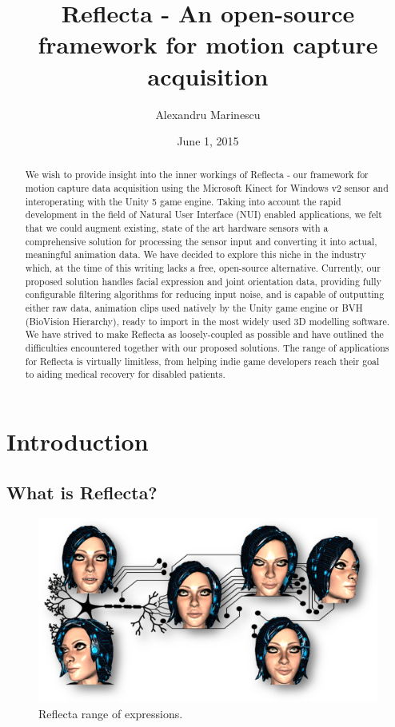 \documentclass[a4paper, 12pt]{amsart}
\title[Reflecta]{Reflecta - An open-source framework for motion capture acquisition} %
\author{Alexandru Marinescu}
\date{June 1, 2015} %
\begin{document}
\begin{abstract}
We wish to provide insight into the inner workings of Reflecta - our framework for motion capture data acquisition using the Microsoft Kinect for Windows v2 sensor and interoperating with the Unity 5 game engine. Taking into account the rapid development in the field of Natural User Interface (NUI) enabled applications, we felt that we could augment existing, state of the art hardware sensors with a comprehensive solution for processing the sensor input and converting it into actual, meaningful animation data. We have decided to explore this niche in the industry which, at the time of this writing lacks a free, open-source alternative. Currently, our proposed solution handles facial expression and joint orientation data, providing fully configurable filtering algorithms for reducing input noise, and is capable of outputting either raw data, animation clips used natively by the Unity game engine or BVH (BioVision Hierarchy), ready to import in the most widely used 3D modelling software. We have strived to make Reflecta as loosely-coupled as possible and have outlined the difficulties encountered together with our proposed solutions. The range of applications for Reflecta is virtually limitless, from helping indie game developers reach their goal to aiding medical recovery for disabled patients.
\end{abstract}

\maketitle

\clearpage

\tableofcontents

\clearpage

\section{Introduction}

\subsection{What is Reflecta?}

\begin{figure}[htb]
\centering
\includegraphics[width=.9\linewidth]{fig_reflecta_splash}
\caption{Reflecta range of expressions.}
\label{fig:reflecta_splash}
\end{figure}
\end{document}

